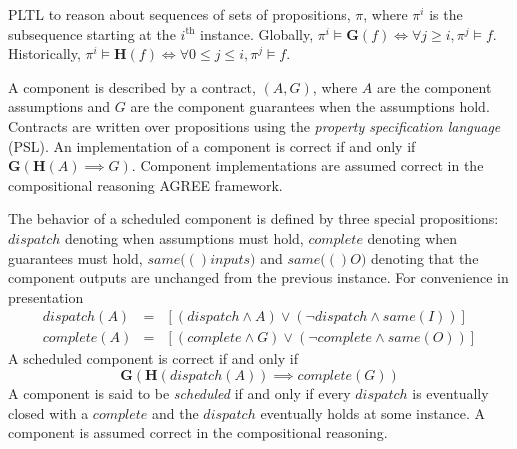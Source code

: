 
\newcommand{\globally}{\ensuremath{\mathbf{G}}}
\newcommand{\historically}{\ensuremath{\mathbf{H}}}
\newcommand{\assumes}{\ensuremath{A}}
\newcommand{\guarantees}{\ensuremath{G}}
\newcommand{\dispatch}{\ensuremath{\mathit{dispatch}}}
\newcommand{\complete}{\ensuremath{\mathit{complete}}}
\newcommand{\same}[1]{\ensuremath{\mathit{same}(#1)}}
\newcommand{\inputs}{\ensuremath{I}}
\newcommand{\outputs}{\ensuremath{O}}
\newcommand{\system}{\ensuremath{S}}
\newcommand{\components}{\ensuremath{C}}
\newcommand{\schedule}{\ensuremath{\phi}}
\newcommand{\valid}{\ensuremath{\mathit{valid}}}

PLTL to reason about sequences of sets of propositions, $\pi$, where $\pi^i$ is the subsequence starting at the $i^\mathrm{th}$ instance.
Globally, $\pi^i \models \globally(f) \iff \forall j \ge i, \pi^j \models f$.
Historically, $\pi^i \models \historically(f) \iff \forall 0 \le j \le i, \pi^j \models f$.

A component is described by a contract, $(\assumes, \guarantees)$, where $\assumes$ are the component assumptions and $\guarantees$ are the component guarantees when the assumptions hold.
Contracts are written over propositions using the \emph{property specification language} (PSL).
An implementation of a component is correct if and only if $\globally(\historically(\assumes) \implies \guarantees)$.
Component implementations are assumed correct in the compositional reasoning AGREE framework.

The behavior of a scheduled component is defined by three special propositions: $\dispatch$ denoting when assumptions must hold, $\complete$ denoting when guarantees must hold, $\same(inputs)$ and $\same(\outputs)$ denoting that the component outputs are unchanged from the previous instance. For convenience in presentation
\begin{eqnarray*}
  \dispatch(A) &=& \left[\left(\dispatch \wedge \assumes\right) \vee \left(\neg\dispatch \wedge \same{\inputs}\right)\right] \\
  \complete(A) &=& \left[\left(\complete \wedge \guarantees\right) \vee \left(\neg\complete \wedge \same{\outputs}\right)\right]
\end{eqnarray*}
A scheduled component is correct if and only if
\[
  \globally\left(
    \historically\left(\dispatch(\assumes)\right) \implies \complete(\guarantees) \right)
\]
A component is said to be \emph{scheduled} if and only if every $\dispatch$ is eventually closed with a $\complete$ and the $\dispatch$ eventually holds at some instance.
A component is assumed correct in the compositional reasoning.

